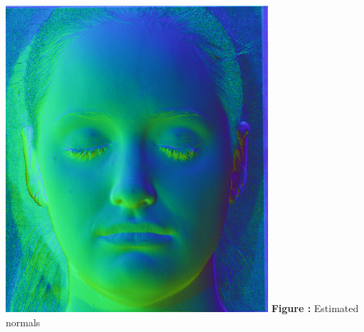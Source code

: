 \documentclass{article}
\begin{document}
	\begin{minipage}{0.48\linewidth}
	\centering
	\includegraphics[width=\linewidth]{./src/2b-b.png}
	\textbf{Figure \thefigure:} Estimated normals  %
	\label{fig:Q2_b_b}         %
	\end{minipage}	
	\newline
	\newline
	
\end{document}
